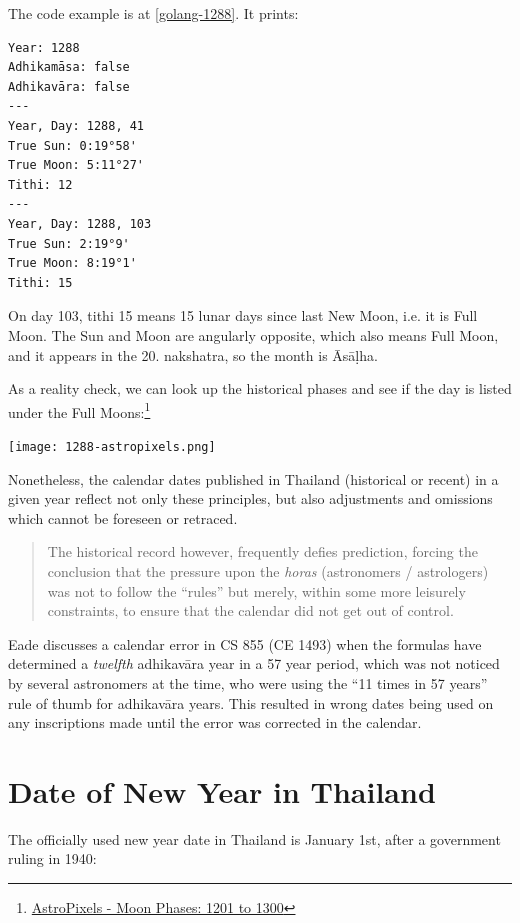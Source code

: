 \documentclass[11pt,oneside]{memoir-article}
\begin{document}
The code example is at \ref{golang-1288}. It prints:

\begin{verbatim}
Year: 1288
Adhikamāsa: false
Adhikavāra: false
---
Year, Day: 1288, 41
True Sun: 0:19°58'
True Moon: 5:11°27'
Tithi: 12
---
Year, Day: 1288, 103
True Sun: 2:19°9'
True Moon: 8:19°1'
Tithi: 15
\end{verbatim}

On day 103, tithi 15 means 15 lunar days since last New Moon, i.e. it is Full
Moon. The Sun and Moon are angularly opposite, which also means Full Moon, and
it appears in the 20. nakshatra, so the month is Āsāḷha.

As a reality check, we can look up the historical phases and see if
the day is listed under the Full Moons:\footnote{\href{http://astropixels.com/ephemeris/phasescat/phases1201.html}{AstroPixels - Moon Phases: 1201 to 1300}}

{\centering
\texttt{[image: 1288-astropixels.png]}
\par}

Nonetheless, the calendar dates published in Thailand (historical or
recent) in a given year reflect not only these principles, but also
adjustments and omissions which cannot be foreseen or retraced.

\begin{quote}
The historical record however, frequently defies prediction, forcing
the conclusion that the pressure upon the \emph{horas} (astronomers /
astrologers) was not to follow the ``rules'' but merely, within some
more leisurely constraints, to ensure that the calendar did not get
out of control.\autocite{eade1995calendrical}
\end{quote}

Eade discusses a calendar error in CS 855 (CE 1493) when the formulas have
determined a \emph{twelfth} adhikavāra year in a 57 year period, which was not
noticed by several astronomers at the time, who were using the ``11 times in 57
years'' rule of thumb for adhikavāra years. This resulted in wrong dates being
used on any inscriptions made until the error was corrected in the
calendar.\autocite{eade2007irregular}

\section{Date of New Year in Thailand}
\label{sec-3-1}

The officially used new year date in Thailand is January 1st, after a government
ruling in 1940:
\end{document}
